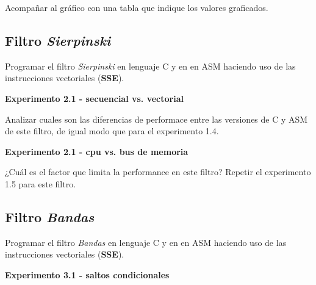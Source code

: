 Acompañar al gráfico con una tabla que indique los valores graficados.  
  
%
%
%	


\subsection*{Filtro \textit{Sierpinski}}

Programar el filtro \textit{Sierpinski} en lenguaje C y en en ASM haciendo 
uso de las instrucciones vectoriales (\textbf{SSE}).

\vspace*{0.3cm} \noindent
\textbf{Experimento 2.1 - secuencial vs. vectorial}

Analizar cuales son las diferencias de performace entre las versiones de C 
y ASM de este filtro, de igual modo que para el experimento 1.4.

\vspace*{0.3cm} \noindent
\textbf{Experimento 2.1 - cpu vs. bus de memoria}

¿Cuál es el factor que limita la performance en este filtro?
Repetir el experimento 1.5 para este filtro.

\subsection*{Filtro \textit{Bandas}}

Programar el filtro \textit{Bandas} en lenguaje C y en en ASM haciendo uso de 
las instrucciones vectoriales (\textbf{SSE}).

\vspace*{0.3cm} \noindent
\textbf{Experimento 3.1 - saltos condicionales}

